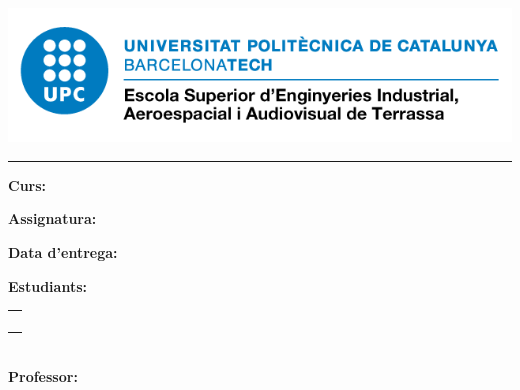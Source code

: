 
\thispagestyle{CoverPage}


\begin{center}\bf
\vspace{80pt}
{\large \School}

\vspace{10pt}
\includegraphics[scale=0.5]{./doc_config/image}\par

\vspace{80pt}
{\fontsize{30pt}{30pt}\selectfont \ProjectName}

\vspace{10pt}
{\Huge \SubName}

\vspace{10pt}
\textcolor{UPC_blue}{\rule{\textwidth}{.6pt}}
{\Large \DocType}
\end{center}

\vspace{130pt}

\textbf{Curs:} \Degree

\textbf{Assignatura:} \Course

\textbf{Data d'entrega:} \DocDate\\

\vspace{10pt}

\textbf{Estudiants:}\vspace{7pt}

\begin{tabular}{l}
	\Studi   \\
	\Studii   \\
	\Studiii   \\
	\Studiv  \\
	
\end{tabular}\\

\vspace{10pt}
\textbf{Professor:} \Professor